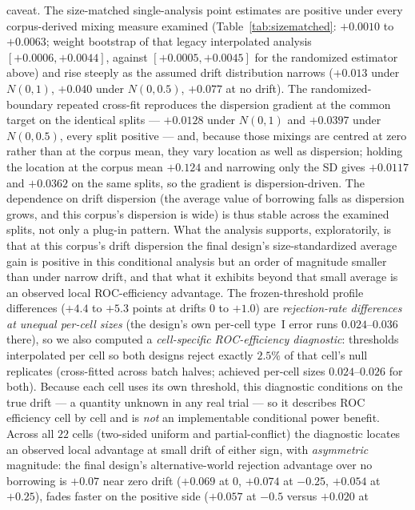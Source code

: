 \documentclass[11pt]{article}
\begin{document}
caveat. The size-matched
single-analysis point estimates are positive under every corpus-derived
mixing measure examined
(Table~\ref{tab:sizematched}: $+0.0010$ to $+0.0063$; weight bootstrap
of that legacy interpolated analysis $[+0.0006, +0.0044]$, against
$[+0.0005, +0.0045]$ for the randomized estimator above) and rise
steeply as the assumed
drift distribution narrows ($+0.013$ under $N(0,1)$, $+0.040$ under
$N(0,0.5)$, $+0.077$ at no drift). The randomized-boundary repeated
cross-fit reproduces the dispersion gradient at the common
target on the identical splits --- $+0.0128$ under $N(0,1)$ and
$+0.0397$ under $N(0,0.5)$, every split positive --- and, because
those mixings are centred at zero rather than at the corpus mean, they
vary location as well as dispersion; holding the location at the
corpus mean $+0.124$ and narrowing only the SD gives $+0.0117$ and
$+0.0362$ on the same splits, so the gradient is dispersion-driven.
The dependence on drift dispersion (the
average value of borrowing falls as dispersion grows, and this corpus's
dispersion is wide) is thus stable across the examined splits, not
only a plug-in
pattern. What
the analysis supports,
exploratorily, is that at this corpus's drift dispersion the final
design's size-standardized average gain is positive in this
conditional analysis but an order of magnitude
smaller than under narrow drift, and that what it exhibits beyond that
small average is an observed local ROC-efficiency advantage. The frozen-threshold profile differences
($+4.4$ to $+5.3$ points at drifts $0$ to $+1.0$) are \emph{rejection-rate
differences at unequal per-cell sizes} (the design's own per-cell type~I
error runs $0.024$--$0.036$ there), so we also computed a
\emph{cell-specific ROC-efficiency diagnostic}: thresholds interpolated
per cell so both designs reject exactly
$2.5\%$ of that cell's null replicates (cross-fitted across batch halves;
achieved per-cell sizes $0.024$--$0.026$ for both). Because each cell
uses its own threshold, this diagnostic conditions on the true drift ---
a quantity unknown in any real trial --- so it describes ROC efficiency
cell by cell and is \emph{not} an implementable conditional power
benefit. Across all $22$ cells (two-sided uniform and partial-conflict)
the diagnostic locates an observed local advantage at small drift of
either sign, with \emph{asymmetric} magnitude: the final design's
alternative-world rejection advantage over no borrowing is $+0.07$ near
zero drift ($+0.069$ at $0$, $+0.074$ at $-0.25$, $+0.054$ at $+0.25$),
fades faster on the positive side ($+0.057$ at $-0.5$ versus $+0.020$ at
\end{document}
